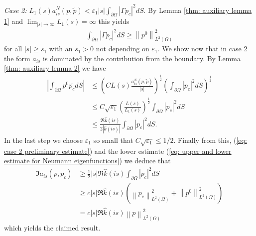 \documentclass{amsart}
\newcommand{\abs}[1]{\left|#1\right|}
\newcommand{\norm}[1]{\left\| #1 \right\|}
\newcommand{\khat}{\hat{k}}
\newcommand{\ptilde}{\tilde{p}}
\begin{document}
\emph{Case 2: } $L_1(s)a^N_{is}(p,\ptilde) < \varepsilon_1 \abs{s}\int_{\partial\Omega}\abs{\Gamma p_c}^2 dS$. By Lemma \ref{thm: auxiliary lemma 1} and $\lim_{\abs{s}\rightarrow\infty} L_1(s)=\infty$ this yields
\begin{align}\label{eq: case 2 preliminary estimate}
 \int_{\partial\Omega}\abs{\Gamma p_c}^2 dS \geq \norm{p^0}_{L^2(\Omega)}^2
\end{align}
for all $\abs{s}\geq s_1$ with an $s_1>0$ not depending on $\varepsilon_1$. We show now that in case 2 the form $a_{is}$ is dominated by the contribution from the boundary. By Lemma \ref{thm: auxiliary lemma 2} we have 
\begin{align*}
 \abs{\int_{\partial\Omega} p^0\overline{p_c} dS} 
 &\leq \left(CL(s)\frac{a^N_{is}(p,\ptilde)}{\abs{s}}\right)^{\frac{1}{2}} \left(\int_{\partial\Omega} \abs{p_c}^2 dS \right)^{\frac{1}{2}} \\
 &\leq C\sqrt{\varepsilon_1} \left(\frac{L(s)}{L_1(s)}\right)^{\frac{1}{2}} \int_{\partial\Omega} \abs{p_c}^2 dS \\
 &\leq \frac{\Re\khat(is)}{2\abs{\khat(is)}}\int_{\partial\Omega} \abs{p_c}^2 dS .
\end{align*}
In the last step we choose $\varepsilon_1$ so small that $C\sqrt{\varepsilon_1}\leq1/2$. Finally from this, (\ref{eq: case 2 preliminary estimate}) and the lower estimate (\ref{eq: upper and lower estimate for Neumann eigenfunctions}) we deduce that
\begin{align*}
 \Im a_{is}(p, p_c) &\geq \frac{1}{2}\abs{s}\Re\khat(is)\int_{\partial\Omega} \abs{p_c}^2 dS \\
 &\geq c \abs{s}\Re\khat(is) (\norm{p_c}_{L^2(\Omega)}^2 + \norm{p^0}_{L^2(\Omega)}^2) \\
 &= c \abs{s}\Re\khat(is) \norm{p}_{L^2(\Omega)}^2
\end{align*}
which yields the claimed result.

\end{document}
